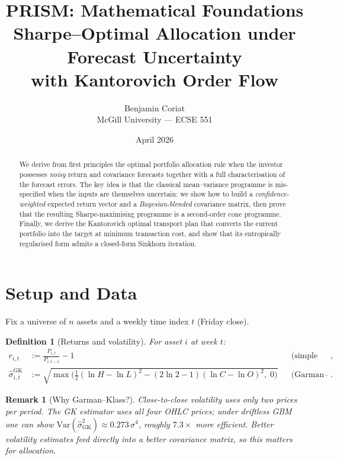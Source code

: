 \documentclass[11pt]{article}
\title{\textbf{PRISM: Mathematical Foundations}\\[6pt]
\large Sharpe--Optimal Allocation under Forecast Uncertainty\\
with Kantorovich Order Flow}
\author{Benjamin Coriat\\McGill University --- ECSE 551}
\date{April 2026}
\newtheorem{definition}[theorem]{Definition}
\newtheorem{remark}[theorem]{Remark}
\newcommand{\Var}{\mathrm{Var}}
\begin{document}
\maketitle

\begin{abstract}
We derive from first principles the optimal portfolio allocation rule when the investor
possesses \emph{noisy} return and covariance forecasts together with a full characterisation
of the forecast errors.  The key idea is that the classical mean--variance programme
is mis-specified when the inputs are themselves uncertain: we show how to build a
\emph{confidence-weighted} expected return vector and a \emph{Bayesian-blended}
covariance matrix, then prove that the resulting Sharpe-maximising programme is a
second-order cone programme.  Finally, we derive the Kantorovich optimal transport
plan that converts the current portfolio into the target at minimum transaction cost,
and show that its entropically regularised form admits a closed-form Sinkhorn iteration.
\end{abstract}

\newpage
\tableofcontents
\newpage

\section{Setup and Data}\label{sec:setup}

Fix a universe of $n$ assets and a weekly time index $t$ (Friday close).

\begin{definition}[Returns and volatility]\label{def:basics}
For asset $i$ at week $t$:
\begin{align}
r_{i,t} &:= \frac{P_{i,t}}{P_{i,t-1}} - 1 && \text{(simple weekly return)},\\[4pt]
\hat\sigma_{i,t}^{\mathrm{GK}} &:= \sqrt{\max\!\Big(\tfrac12(\ln H - \ln L)^2
  - (2\ln 2-1)(\ln C - \ln O)^2,\;0\Big)} && \text{(Garman--Klass vol)}.
\end{align}
\end{definition}

\begin{remark}[Why Garman--Klass?]
Close-to-close volatility uses only two prices per period.  The GK estimator
uses all four OHLC prices; under driftless GBM one can show
$\Var(\hat\sigma_{\mathrm{GK}}^2)\approx 0.273\,\sigma^4$,
roughly $7.3\times$ more efficient.  Better volatility estimates
feed directly into a better covariance matrix, so this matters for allocation.
\end{remark}
\end{document}

